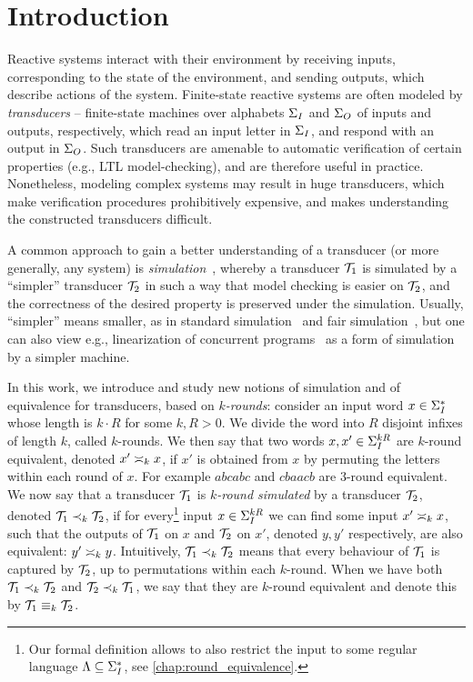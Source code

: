 \chapter{Introduction}
\label{chap:intro}

Reactive systems interact with their environment by receiving inputs, corresponding to the state of the environment, and sending outputs, which describe actions of the system. Finite-state reactive systems are often modeled by \emph{transducers} -- finite-state machines over alphabets $\sI$ and $\sO$ of inputs and outputs, respectively, which read an input letter in $\sI$, and respond with an output in $\sO$. 
Such transducers are amenable to automatic verification of certain properties (e.g., LTL model-checking), and are therefore useful in practice. Nonetheless, modeling complex systems may result in huge transducers, which make verification procedures prohibitively expensive, and makes understanding the constructed transducers difficult.

A common approach to gain a better understanding of a transducer (or more generally, any system) is \emph{simulation}~\cite{Milner1971}, whereby a transducer $\cT_1$ is simulated by a ``simpler'' transducer $\cT_2$ in such a way that model checking is easier on $\cT_2$, and the correctness of the desired property is preserved under the simulation. Usually, ``simpler'' means smaller, as in standard simulation~\cite{Milner1971} and fair simulation~\cite{Henzinger1997}, but one can also view e.g., linearization of concurrent programs~\cite{Herlihy1987} as a form of simulation by a simpler machine.

In this work, we introduce and study new notions of simulation and of equivalence for transducers, based on \emph{$k$-rounds}: consider an input word $x\in \sI^*$ whose length is $k\cdot R$ for some $k,R>0$. We divide the word into $R$ disjoint infixes of length $k$, called $k$-rounds. We then say that two words $x,x'\in \sI^{kR}$ are $k$-round equivalent, denoted $x'\req[k]x$, if $x'$ is obtained from $x$ by permuting the letters within each round of $x$. For example $abcabc$ and $cbaacb$ are $3$-round equivalent. We now say that a transducer $\cT_1$ is \emph{$k$-round simulated} by a transducer $\cT_2$, denoted $\cT_1\prec_{k} \cT_2$, if for every\footnote{Our formal definition allows to also restrict the input to some regular language $\fL\subseteq \sI^*$, see \autoref{chap:round_equivalence}.} input $x\in \sI^{kR}$ we can find some input $x'\req[k]x$, such that the outputs of $\cT_1$ on $x$ and $\cT_2$ on $x'$, denoted $y,y'$ respectively, are also equivalent: $y'\req[k] y$.
Intuitively, $\cT_1\prec_{k}\cT_2$ means that every behaviour of $\cT_1$ is captured by $\cT_2$, up to permutations within each $k$-round.
When we have both $\cT_1\prec_{k}\cT_2$ and $\cT_2\prec_{k}\cT_1$, we say that they are $k$-round equivalent and denote this by $\cT_1\equiv_{k}\cT_2$.


